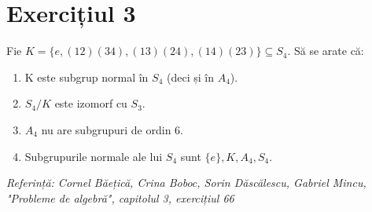 \documentclass{article}
\begin{document}
\section{Exercițiul 3}
Fie $K = \{ e, (12)(34), (13)(24), (14)(23) \} \subseteq S_4$. Să se arate că: 
\begin{enumerate}
    \item K este subgrup normal în $S_4$ (deci și în $A_4$).
    \item $S_4/K$ este izomorf cu $S_3$.
    \item $A_4$ nu are subgrupuri de ordin 6.
    \item Subgrupurile normale ale lui $S_4$ sunt $\{e\}, K, A_4, S_4$.
\end{enumerate}
\emph{Referință: Cornel Băețică, Crina Boboc, Sorin Dăscălescu, Gabriel Mincu, "Probleme de algebră", capitolul 3, exercițiul 66}
\end{document}
